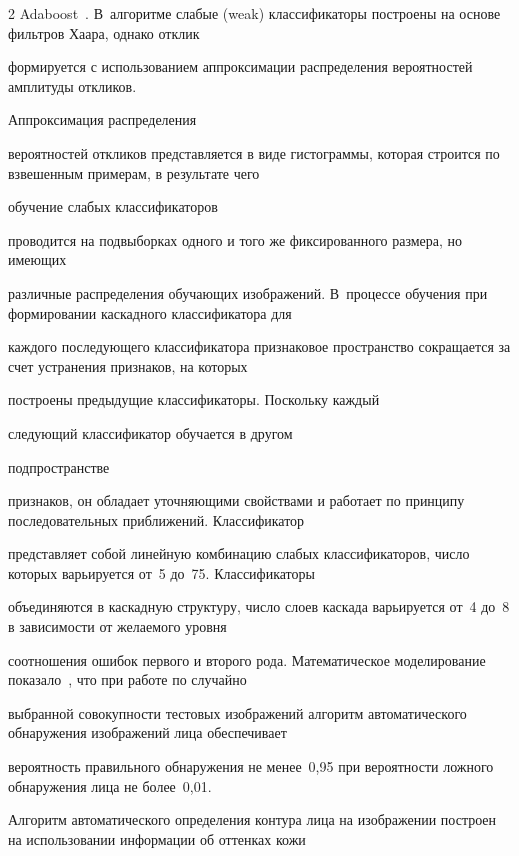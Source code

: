 \begin{multicols}{2}
Adaboost~\cite{1kor, 2kor}. В~алгоритме слабые (weak) классификаторы построены на основе фильтров Хаара, однако отклик 


формируется с использованием аппроксимации распределения вероятностей амплитуды откликов.\linebreak


 Аппроксимация распределения 


вероятностей откликов представляется в виде гистограммы, которая строится по взвешенным примерам, в результате чего 


обучение слабых классификаторов\linebreak


 проводится на подвыборках одного и того же фиксированного размера, но имеющих 


различные распределения обучающих изображений. В~процессе обучения при формировании каскадного классификатора для 


каж\-до\-го последующего классификатора признаковое пространство сокращается за счет устранения признаков, на которых 


построены предыдущие классификаторы. Поскольку каждый\linebreak


 следующий классификатор обучается в другом\linebreak


  подпространстве 


признаков, он обладает уточ\-ня\-ющи\-ми свойствами и работает по принципу последовательных приближений. Классификатор 


представляет собой линейную комбинацию слабых классификаторов, число которых варьируется от~5 до~75. Классификаторы 


объединяются в каскадную структуру, число слоев каскада варьируется от~4 до~8 в зависимости от желаемого уровня 


соотношения ошибок первого и второго рода. Математическое моделирование показало~\cite{3kor}, что при работе по случайно 


выбранной совокупности тестовых изоб\-ра\-же\-ний алгоритм автоматического обнаружения изображений лица обеспечивает 


вероятность правильного обнаружения не менее~0,95 при веро\-ят\-ности ложного обнаружения лица не более~0,01. 





Алгоритм автоматического определения контура лица на изображении построен на использовании информации об оттенках кожи 



\end{multicols}
